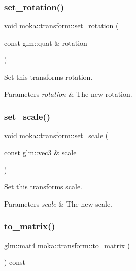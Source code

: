 \subsubsection{\texorpdfstring{set\_rotation()}{set\_rotation()}}
{\footnotesize\ttfamily void moka\+::transform\+::set\+\_\+rotation (\begin{DoxyParamCaption}\item[{const glm\+::quat \&}]{rotation }\end{DoxyParamCaption})}



Set this transform\textquotesingle{}s rotation. 


\begin{DoxyParams}{Parameters}
{\em rotation} & The new rotation. \\
\hline
\end{DoxyParams}
\mbox{\label{classmoka_1_1transform_a2c047551ab0948aa8400f86d357619ce}} 
\subsubsection{\texorpdfstring{set\_scale()}{set\_scale()}}
{\footnotesize\ttfamily void moka\+::transform\+::set\+\_\+scale (\begin{DoxyParamCaption}\item[{const \mbox{\hyperlink{namespacemoka_aed2224bc0e5b79e57a8975ded94ee1aaa97ade28e93c0de60adc075bdbe07ca36}{glm\+::vec3}} \&}]{scale }\end{DoxyParamCaption})}



Set this transform\textquotesingle{}s scale. 


\begin{DoxyParams}{Parameters}
{\em scale} & The new scale. \\
\hline
\end{DoxyParams}
\mbox{\label{classmoka_1_1transform_a01484fe05bd028cd37ceca8c1e95fbde}} 
\subsubsection{\texorpdfstring{to\_matrix()}{to\_matrix()}}
{\footnotesize\ttfamily \mbox{\hyperlink{namespacemoka_aed2224bc0e5b79e57a8975ded94ee1aaabe14b41eb96410ea28b32bc138d885ae}{glm\+::mat4}} moka\+::transform\+::to\+\_\+matrix (\begin{DoxyParamCaption}{ }\end{DoxyParamCaption}) const}




